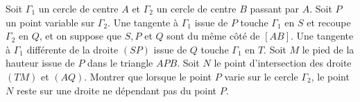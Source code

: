 Soit $\Gamma_1$ un cercle de centre $A$ et $\Gamma_2$ un cercle de centre $B$ passant par $A$. Soit $P$ un point variable sur $\Gamma_2$. Une tangente à $\Gamma_1$ issue de $P$ touche $\Gamma_1$ en $S$ et recoupe $\Gamma_2$ en $Q$, et on suppose que $S, P$ et $Q$ sont du même côté de $[AB]$. Une tangente à $\Gamma_1$ différente de la droite $(SP)$ issue de $Q$ touche $\Gamma_1$ en $T$. Soit $M$ le pied de la hauteur issue de $P$ dans le triangle $APB$. Soit $N$ le point d'intersection des droite $(TM)$ et $(AQ)$. Montrer que lorsque le point $P$ varie sur le cercle $\Gamma_2$, le point $N$ reste sur une droite ne dépendant pas du point $P$.